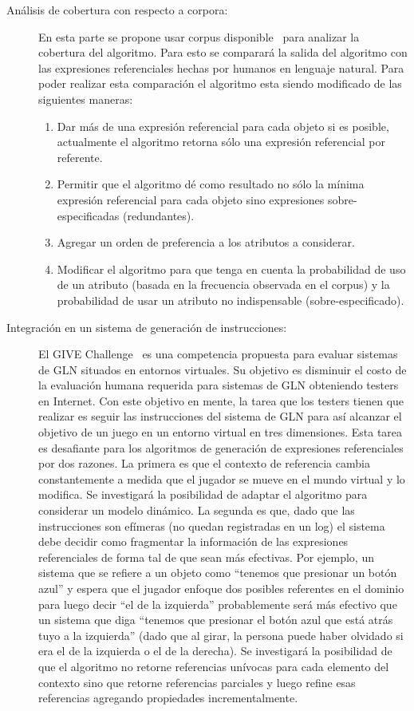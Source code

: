 \begin{description}
\item[An\'alisis de cobertura con respecto a corpora:] En esta parte se propone usar corpus disponible~\cite{viethen-dale:2011:UCNLG+Eval} para analizar la cobertura del algoritmo. Para esto se comparar\'a la salida del algoritmo con las expresiones referenciales hechas por humanos en lenguaje natural. Para poder realizar esta comparaci\'on el algoritmo esta siendo modificado de las siguientes maneras:
\begin{enumerate}
   \item Dar m\'as de una expresi\'on referencial para cada objeto si es posible, actualmente el algoritmo retorna s\'olo una expresi\'on referencial por referente.
   \item Permitir que el algoritmo d\'e como resultado no s\'olo la m\'inima expresi\'on referencial para cada objeto sino expresiones sobre-especificadas (redundantes).
   \item Agregar un orden de preferencia a los atributos a considerar.
   \item Modificar el algoritmo para que tenga en cuenta la probabilidad de uso de un atributo (basada en la frecuencia observada en el corpus) y la probabilidad de usar un atributo no indispensable (sobre-especificado).
\end{enumerate}
\item[Integraci\'on en un sistema de generaci\'on de instrucciones:] El GIVE Challenge~\cite{KolByrCasDalStrMooObe09} es una competencia propuesta para evaluar sistemas de GLN situados en entornos virtuales. Su objetivo es disminuir el costo de la evaluaci\'on humana requerida para sistemas de GLN obteniendo testers en Internet. Con este objetivo en mente, la tarea que los testers tienen que realizar es seguir las instrucciones del sistema de GLN para as\'i alcanzar el objetivo de un juego en un entorno virtual en tres dimensiones. Esta tarea es desafiante para los algoritmos de generaci\'on de expresiones referenciales por dos razones. La primera es que el contexto de referencia cambia constantemente a medida que el jugador se mueve en el mundo virtual y lo modifica. Se investigar\'a la posibilidad de adaptar el algoritmo para considerar un modelo din\'amico. La segunda es que, dado que las instrucciones son ef\'imeras (no quedan registradas en un log) el sistema debe decidir como fragmentar la informaci\'on de las expresiones referenciales de forma tal de que sean m\'as efectivas. Por ejemplo, un sistema que se refiere a un objeto como ``tenemos que presionar un bot\'on azul'' y espera que el jugador enfoque dos posibles referentes en el dominio para luego decir ``el de la izquierda'' probablemente ser\'a m\'as efectivo que un sistema que diga ``tenemos que presionar el bot\'on azul que est\'a atr\'as tuyo a la izquierda'' (dado que al girar, la persona puede haber olvidado si era el de la izquierda o el de la derecha). Se investigar\'a la posibilidad de que el algoritmo no retorne referencias un\'ivocas para cada elemento del contexto sino que retorne referencias parciales y luego refine esas referencias agregando propiedades incrementalmente. 
\end{description}

